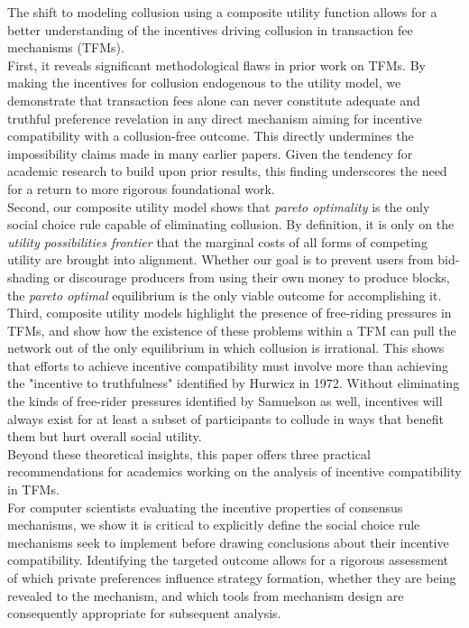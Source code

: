 \documentclass[11pt,a4paper]{llncs}
\begin{document}
The shift to modeling collusion using a composite utility function allows for a better understanding of the incentives driving collusion in transaction fee mechanisms (TFMs).
\vspace{0.2cm} \\
First, it reveals significant methodological flaws in prior work on TFMs. By making the incentives for collusion endogenous to the utility model, we demonstrate that transaction fees alone can never constitute adequate and truthful preference revelation in any direct mechanism aiming for incentive compatibility with a collusion-free outcome. This directly undermines the impossibility claims made in many earlier papers. Given the tendency for academic research to build upon prior results, this finding underscores the need for a return to more rigorous foundational work.
\vspace{0.2cm} \\
Second, our composite utility model shows that \textit{pareto optimality} is the only social choice rule capable of eliminating collusion. By definition, it is only on the \textit{utility possibilities frontier} that the marginal costs of all forms of competing utility are brought into alignment. Whether our goal is to prevent users from bid-shading or discourage producers from using their own money to produce blocks, the \textit{pareto optimal} equilibrium is the only viable outcome for accomplishing it.
\vspace{0.2cm} \\
Third, composite utility models highlight the presence of free-riding pressures in TFMs, and show how the existence of these problems within a TFM can pull the network out of the only equilibrium in which collusion is irrational. This shows that efforts to achieve incentive compatibility must involve more than achieving the "incentive to truthfulness" identified by Hurwicz in 1972. Without eliminating the kinds of free-rider pressures identified by Samuelson as well, incentives will always exist for at least a subset of participants to collude in ways that benefit them but hurt overall social utility.
\vspace{0.2cm} \\
Beyond these theoretical insights, this paper offers three practical recommendations for academics working on the analysis of incentive compatibility in TFMs.
\vspace{0.2cm} \\
For computer scientists evaluating the incentive properties of consensus mechanisms, we show it is critical to explicitly define the social choice rule mechanisms seek to implement before drawing conclusions about their incentive compatibility. Identifying the targeted outcome allows for a rigorous assessment of which private preferences influence strategy formation, whether they are being revealed to the mechanism, and which tools from mechanism design are consequently appropriate for subsequent analysis.
\end{document}
